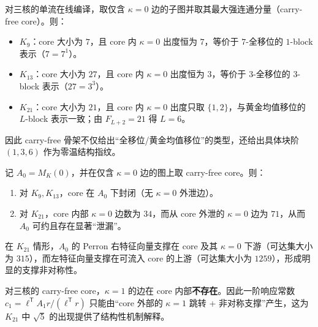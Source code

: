 \begin{proposition}\label{prop:carry-free-core-block}
对三核的单流在线编译，取仅含 $\kappa=0$ 边的子图并取其最大强连通分量（carry-free core）。则：
\begin{itemize}
  \item $K_9$：core 大小为 $7$，且 core 内 $\kappa=0$ 出度恒为 $7$，等价于 $7$-全移位的 $1$-block 表示（$7=7^1$）。
  \item $K_{13}$：core 大小为 $27$，且 core 内 $\kappa=0$ 出度恒为 $3$，等价于 $3$-全移位的 $3$-block 表示（$27=3^3$）。
  \item $K_{21}$：core 大小为 $21$，且 core 内 $\kappa=0$ 出度只取 $\{1,2\}$，与黄金均值移位的 $L$-block 表示一致；由 $F_{L+2}=21$ 得 $L=6$。
\end{itemize}
因此 carry-free 骨架不仅给出“全移位/黄金均值移位”的类型，还给出具体块阶 $(1,3,6)$ 作为零温结构指纹。
\end{proposition}

\begin{proposition}\label{prop:carry-free-leakage}
记 $A_0=M_K(0)$，并在仅含 $\kappa=0$ 边的图上取 carry-free core。则：
\begin{enumerate}
  \item 对 $K_9,K_{13}$，core 在 $A_0$ 下封闭（无 $\kappa=0$ 外泄边）。
  \item 对 $K_{21}$，core 内部 $\kappa=0$ 边数为 $34$，而从 core 外泄的 $\kappa=0$ 边为 $71$，从而 $A_0$ 可约且存在显著“泄漏”。
\end{enumerate}
在 $K_{21}$ 情形，$A_0$ 的 Perron 右特征向量支撑在 core 及其 $\kappa=0$ 下游（可达集大小为 $315$），而左特征向量支撑在可流入 core 的上游（可达集大小为 $1259$），形成明显的支撑非对称性。
\end{proposition}

\begin{proposition}\label{prop:no-kappa1-in-core}
对三核的 carry-free core，$\kappa=1$ 的边在 core 内部\textbf{不存在}。因此一阶响应常数
\(
c_1=\ell^{\mathsf T}A_1r/(\ell^{\mathsf T}r)
\)
只能由“core 外部的 $\kappa=1$ 跳转 + 非对称支撑”产生，这为 $K_{21}$ 中 $\sqrt5$ 的出现提供了结构性机制解释。
\end{proposition}

